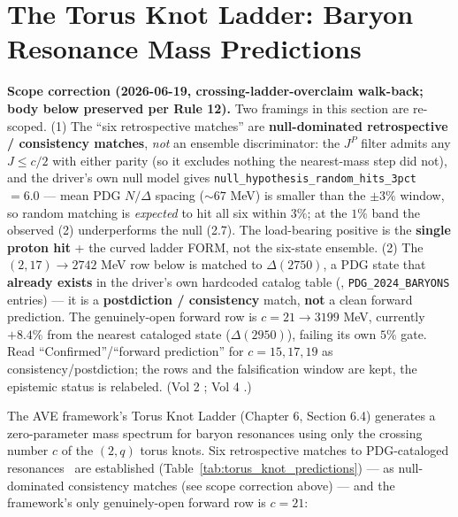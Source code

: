 \section{The Torus Knot Ladder: Baryon Resonance Mass Predictions}

\noindent\textbf{Scope correction (2026-06-19, crossing-ladder-overclaim walk-back; body below preserved per Rule 12).} Two framings in this section are re-scoped. (1) The ``six retrospective matches'' are \textbf{null-dominated retrospective / consistency matches}, \emph{not} an ensemble discriminator: the $J^P$ filter admits any $J \le c/2$ with either parity (so it excludes nothing the nearest-mass step did not), and the driver's own null model gives \texttt{null\_hypothesis\_random\_hits\_3pct} $= 6.0$ --- mean PDG $N/\Delta$ spacing ($\sim 67$ MeV) is smaller than the $\pm 3\%$ window, so random matching is \emph{expected} to hit all six within $3\%$; at the $1\%$ band the observed (2) underperforms the null (2.7). The load-bearing positive is the \textbf{single proton hit} + the curved ladder FORM, not the six-state ensemble. (2) The $(2,17) \to 2742$ MeV row below is matched to $\Delta(2750)$, a PDG state that \textbf{already exists} in the driver's own hardcoded catalog table (, \texttt{PDG\_2024\_BARYONS} entries) --- it is a \textbf{postdiction / consistency} match, \textbf{not} a clean forward prediction. The genuinely-open forward row is $c = 21 \to 3199$ MeV, currently $+8.4\%$ from the nearest cataloged state ($\Delta(2950)$), failing its own $5\%$ gate. Read ``Confirmed''/``forward prediction'' for $c = 15, 17, 19$ as consistency/postdiction; the rows and the falsification window are kept, the epistemic status is relabeled. (Vol 2 ; Vol 4 .)

The AVE framework's Torus Knot Ladder (Chapter 6, Section 6.4) generates a zero-parameter mass spectrum for baryon resonances using only the crossing number $c$ of the $(2,q)$ torus knots. Six retrospective matches to PDG-cataloged resonances~\cite{pdg2022} are established (Table~\ref{tab:torus_knot_predictions}) --- as null-dominated consistency matches (see scope correction above) --- and the framework's only genuinely-open forward row is $c = 21$:

